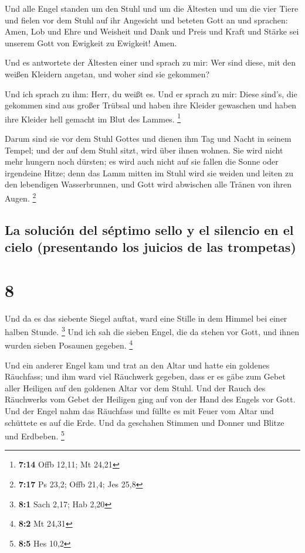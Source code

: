  Und alle Engel standen um den Stuhl und um die Ältesten
und um die vier Tiere und fielen vor dem Stuhl auf ihr Angesicht und
beteten Gott an  und sprachen: Amen, Lob und Ehre und
Weisheit und Dank und Preis und Kraft und Stärke sei unserem Gott von
Ewigkeit zu Ewigkeit! Amen.

 Und es antwortete der Ältesten einer und sprach zu mir:
Wer sind diese, mit den weißen Kleidern angetan, und woher sind sie
gekommen?

 Und ich sprach zu ihm: Herr, du weißt es. Und er sprach
zu mir: Diese sind's, die gekommen sind aus großer Trübsal und haben
ihre Kleider gewaschen und haben ihre Kleider hell gemacht im Blut des
Lammes. \footnote{\textbf{7:14} Offb 12,11; Mt 24,21}

 Darum sind sie vor dem Stuhl Gottes und dienen ihm Tag
und Nacht in seinem Tempel; und der auf dem Stuhl sitzt, wird über ihnen
wohnen.  Sie wird nicht mehr hungern noch dürsten; es
wird auch nicht auf sie fallen die Sonne oder irgendeine Hitze;
 denn das Lamm mitten im Stuhl wird sie weiden und leiten
zu den lebendigen Wasserbrunnen, und Gott wird abwischen alle Tränen von
ihren Augen. \footnote{\textbf{7:17} Ps 23,2; Offb 21,4; Jes 25,8}

\hypertarget{la-soluciuxf3n-del-suxe9ptimo-sello-y-el-silencio-en-el-cielo-presentando-los-juicios-de-las-trompetas}{%
\subsection{La solución del séptimo sello y el silencio en el cielo
(presentando los juicios de las
trompetas)}\label{la-soluciuxf3n-del-suxe9ptimo-sello-y-el-silencio-en-el-cielo-presentando-los-juicios-de-las-trompetas}}

\hypertarget{section-7}{%
\section{8}\label{section-7}}

 Und da es das siebente Siegel auftat, ward eine Stille in
dem Himmel bei einer halben Stunde. \footnote{\textbf{8:1} Sach 2,17;
  Hab 2,20}  Und ich sah die sieben Engel, die da stehen
vor Gott, und ihnen wurden sieben Posaunen gegeben. \footnote{\textbf{8:2}
  Mt 24,31}

 Und ein anderer Engel kam und trat an den Altar und hatte
ein goldenes Räuchfass; und ihm ward viel Räuchwerk gegeben, dass er es
gäbe zum Gebet aller Heiligen auf den goldenen Altar vor dem Stuhl.
 Und der Rauch des Räuchwerks vom Gebet der Heiligen ging
auf von der Hand des Engels vor Gott.  Und der Engel nahm
das Räuchfass und füllte es mit Feuer vom Altar und schüttete es auf die
Erde. Und da geschahen Stimmen und Donner und Blitze und Erdbeben.
\footnote{\textbf{8:5} Hes 10,2}


